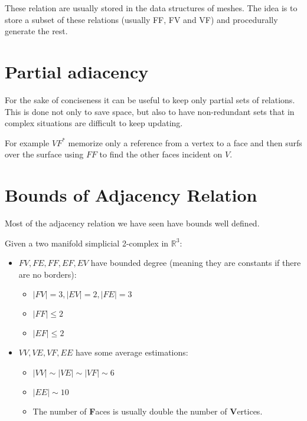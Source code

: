 These relation are usually stored in the data structures of meshes. The idea is to store a subset of these relations (usually FF, FV and VF) and procedurally generate the rest.

\section{Partial adiacency}
For the sake of conciseness it can be useful to keep only partial sets of relations. This is done not only to save space, but also to have non-redundant sets that in complex situations are difficult to keep updating.\par
For example $VF^{*}$ memorize only a reference from a vertex to a face and then surfs over the surface using $FF$ to find the other faces incident on $V$.

\section{Bounds of Adjacency Relation}
Most of the adjacency relation we have seen have bounds well defined. \par
Given a two manifold simplicial 2-complex in $\mathbb{R}^{3}$:

\begin{itemize}
    \item $FV, FE, FF, EF, EV$ have bounded degree (meaning they are constants if there are no borders):
        \begin{itemize}
            \item $|FV| = 3, |EV| = 2, |FE| = 3$
            \item $|FF| \leq 2$
            \item $|EF| \leq 2$
        \end{itemize}
    \item $VV, VE, VF, EE$ have some average estimations:
        \begin{itemize}
            \item $|VV| \sim |VE| \sim |VF| \sim 6$
            \item $|EE| \sim 10$
            \item The number of \textbf{F}aces is usually double the number of \textbf{V}ertices.
        \end{itemize}
\end{itemize}

